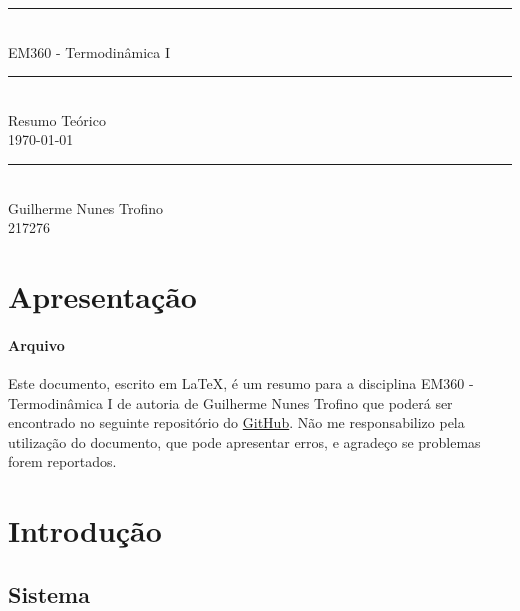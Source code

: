 \documentclass{article}
\begin{document}
\begin{titlepage}
    \begin{center}
        \rule{450pt}{0.5pt}\\[4mm]
        {\Huge EM360 - Termodinâmica I}\\
        \rule{450pt}{0.5pt}\\[2mm]
        {\Large Resumo Teórico}\\[200mm]
        \today\\
        \rule{250pt}{0.5pt}\\
        {\large Guilherme Nunes Trofino}\\
        {\large 217276}\\
    \end{center}
\end{titlepage}
\newpage

        \tableofcontents
    \newpage

    \section{Apresentação}
        \paragraph{Arquivo}Este documento, escrito em \LaTeX, é um resumo para a disciplina EM360 - Termodinâmica I de autoria de Guilherme Nunes Trofino que poderá ser encontrado no seguinte repositório do \href{https://github.com/tr0fin0/classes}{GitHub}. Não me responsabilizo pela utilização do documento, que pode apresentar erros, e agradeço se problemas forem reportados. 
\newpage

    \section{Introdução}
        \subsection{Sistema}
\end{document}

